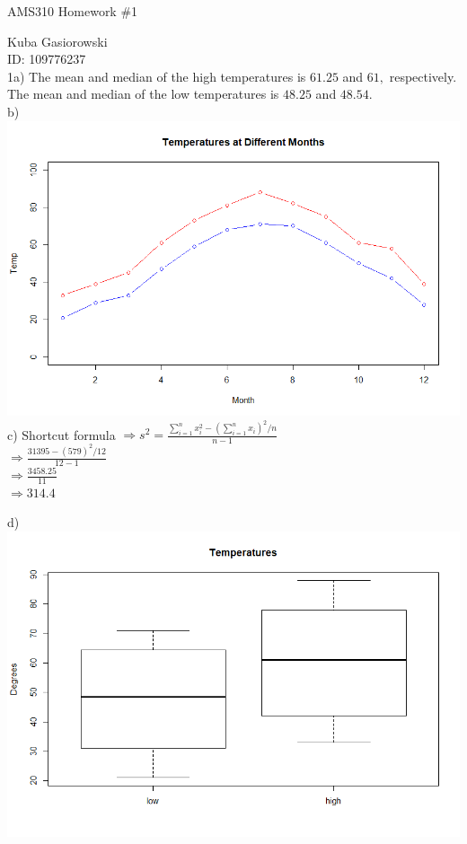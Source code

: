 \documentclass[12pt]{report}
\begin{document}
\Large
\centering
AMS310 Homework \#1

\justify
\normalsize

Kuba Gasiorowski\\
ID: 109776237\\

\noindent1a) The mean and median of the high temperatures is $\boxed{61.25}$ and $\boxed{61,}$ respectively. The mean and median of the low temperatures is $\boxed{48.25}$ and $\boxed{48.54.}$
\bigskip\\
\noindent b) \\\includegraphics[scale=0.625]{temp} \\

\noindent c) Shortcut formula $ \Rightarrow s^2 = \frac{\sum_{i=1}^n x_i^2 - (\sum_{i=1}^nx_i)^2/n}{n-1}$\\
$\Rightarrow \frac{31395 - (579)^2/12}{12-1}$\\
$\Rightarrow \frac{3458.25}{11}$\\
$\Rightarrow \boxed{314.4}$\

\clearpage

\noindent d) \\\includegraphics[scale=0.625]{temp_box}\\
\end{document}
